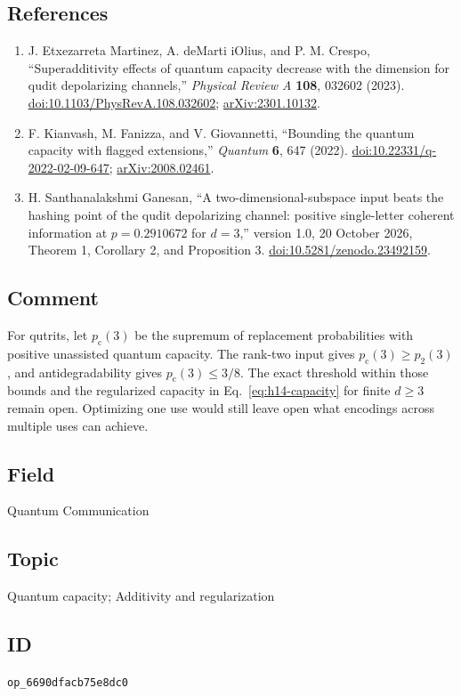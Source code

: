 \subsection*{References}

\begin{enumerate}[label={},leftmargin=4.8em,labelsep=0.5em]
  \footnotesize
  \item[\textup{[EMC23]}]\label{ref:h14-emc}
  J. Etxezarreta Martinez, A. deMarti iOlius, and P. M. Crespo, ``Superadditivity effects of quantum capacity decrease with the dimension for qudit depolarizing channels,'' \emph{Physical Review A} \textbf{108}, 032602 (2023). \href{https://doi.org/10.1103/PhysRevA.108.032602}{doi:10.1103/PhysRevA.108.032602}; \href{https://arxiv.org/abs/2301.10132}{arXiv:2301.10132}.

  \item[\textup{[KFG22]}]\label{ref:h14-kfg}
  F. Kianvash, M. Fanizza, and V. Giovannetti, ``Bounding the quantum capacity with flagged extensions,'' \emph{Quantum} \textbf{6}, 647 (2022). \href{https://doi.org/10.22331/q-2022-02-09-647}{doi:10.22331/q-2022-02-09-647}; \href{https://arxiv.org/abs/2008.02461}{arXiv:2008.02461}.

  \item[\textup{[Gan26]}]\label{ref:h14-ganesan}
  H. Santhanalakshmi Ganesan, “A two-dimensional-subspace input beats the hashing point of the qudit depolarizing channel: positive single-letter coherent information at $p=0.2910672$ for $d=3$,” version 1.0, 20 October 2026, Theorem 1, Corollary 2, and Proposition 3. \href{https://doi.org/10.5281/zenodo.23492159}{doi:10.5281/zenodo.23492159}.
\end{enumerate}

\subsection*{Comment}

For qutrits, let $p_{\mathrm c}(3)$ be the supremum of replacement probabilities with positive unassisted quantum capacity. The rank-two input gives $p_{\mathrm c}(3)\geq p_2(3)$, and antidegradability gives $p_{\mathrm c}(3)\leq3/8$. The exact threshold within those bounds and the regularized capacity in Eq.~\eqref{eq:h14-capacity} for finite $d\geq3$ remain open. Optimizing one use would still leave open what encodings across multiple uses can achieve.  

\subsection*{Field}

Quantum Communication

\subsection*{Topic}

Quantum capacity; Additivity and regularization

\subsection*{ID}

\texttt{op\_6690dfacb75e8dc0}
